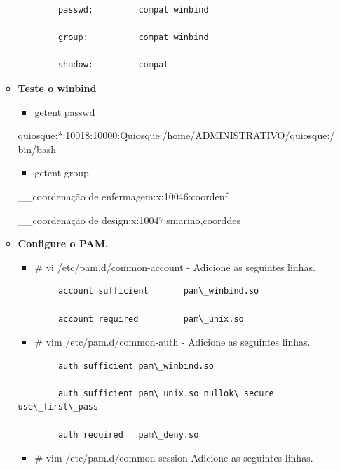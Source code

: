 \begin{enumerate}
\begin{itemize}
\begin{lstlisting}
		passwd:         compat winbind

		group:          compat winbind

		shadow:         compat
		\end{lstlisting}

 	\item \textbf{Teste o winbind}
		\begin{itemize}
			\item {getent passwd}
		\end{itemize}

		quiosque:*:10018:10000:Quiosque:/home/ADMINISTRATIVO/quiosque:/bin/bash

		\begin{itemize}
			\item {getent group}
		\end{itemize}

		\_\_coordenação de enfermagem:x:10046:coordenf

		\_\_coordenação de design:x:10047:smarino,coorddes

	\item \textbf{Configure o PAM.}
		\begin{itemize}
			\item {\# vi /etc/pam.d/common-account} - Adicione as seguintes linhas.
		\end{itemize}

		\begin{lstlisting}
		account sufficient       pam\_winbind.so

		account required         pam\_unix.so
		\end{lstlisting}

		\begin{itemize}
			\item {\# vim /etc/pam.d/common-auth} - Adicione as seguintes linhas.
		\end{itemize}

		\begin{lstlisting}
		auth sufficient pam\_winbind.so

		auth sufficient pam\_unix.so nullok\_secure use\_first\_pass

		auth required   pam\_deny.so
		\end{lstlisting}

		\begin{itemize}
			\item {\# vim /etc/pam.d/common-session} Adicione as seguintes linhas.
		\end{itemize}


\end{itemize}
\end{enumerate}
